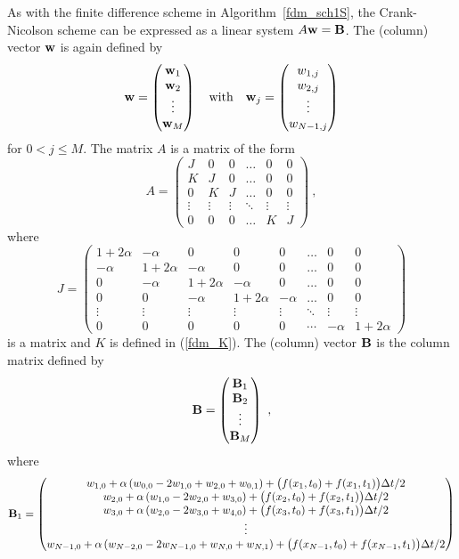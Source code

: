 As with the finite difference scheme in Algorithm~\ref{fdm_sch1S}, the
Crank-Nicolson scheme can be expressed as a linear system
$A \mathbf{w} = \mathbf{B}$.  The (column) vector $\mathbf{w}$ is again defined by
\[
\mathbf{w} = \begin{pmatrix}
\mathbf{w}_1 \\ \mathbf{w}_2 \\ \vdots \\ \mathbf{w}_M
\end{pmatrix}
\quad \text{with} \quad
\mathbf{w}_j =
\begin{pmatrix} w_{1,j} \\ w_{2,j} \\ \vdots \\ w_{N-1,j} \end{pmatrix}
\]
for $0 < j \leq M$. The matrix $A$ is a  matrix of
the form
\[
A = \begin{pmatrix}
J & 0 & 0 & \ldots & 0 & 0 \\
K & J & 0 & \ldots & 0 & 0 \\
0 & K & J & \ldots & 0 & 0 \\
\vdots & \vdots & \vdots & \ddots & \vdots & \vdots \\
0 & 0 & 0 & \ldots & K & J
\end{pmatrix} \ ,
\]
where
\begin{equation} \label{fdm_J}
J = \begin{pmatrix}
1+2\alpha & -\alpha & 0 & 0 & 0 & \ldots & 0 & 0 \\
-\alpha & 1 +2\alpha & -\alpha & 0 & 0 & \ldots & 0 & 0  \\
0 & -\alpha & 1 +2\alpha & -\alpha & 0 & \ldots & 0 & 0 \\
0 & 0 & -\alpha & 1 +2\alpha & -\alpha & \ldots & 0 & 0 \\
\vdots & \vdots & \vdots & \vdots & \vdots & \ddots & \vdots & \vdots \\
0 & 0 & 0 & 0 & 0 & \cdots & -\alpha & 1+2\alpha
\end{pmatrix}
\end{equation}
is a  matrix and $K$ is defined in (\ref{fdm_K}).
The (column) vector $\mathbf{B}$ is the column matrix defined by
\[
\mathbf{B} = \begin{pmatrix} \mathbf{B}_1 \\ \mathbf{B}_2 \\ \vdots \\
\mathbf{B}_M \end{pmatrix} \ ,
\]
where
\[
\mathbf{B}_1 = \begin{pmatrix} 
w_{1,0} + \alpha \left( w_{0,0} - 2 w_{1,0} + w_{2,0} + w_{0,1}\right)
+ \big(f(x_1,t_0) +f(x_1,t_1)\big) \Delta{t}/2 \\
w_{2,0} + \alpha \left( w_{1,0} - 2 w_{2,0} + w_{3,0}\right)
+ \big( f(x_2,t_0) + f(x_2,t_1)\big) \Delta{t}/2  \\
w_{3,0} + \alpha \left( w_{2,0} - 2 w_{3,0} + w_{4,0}\right)
+ \big( f(x_3,t_0) +f(x_3,t_1)\big) \Delta{t}/2 \\
\vdots \\
w_{N-1,0} + \alpha \left( w_{N-2,0} - 2 w_{N-1,0} + w_{N,0} + w_{N,1} \right)
+ \big( f(x_{N-1},t_0) +f(x_{N-1},t_1)\big) \Delta{t}/2
\end{pmatrix}
\]
